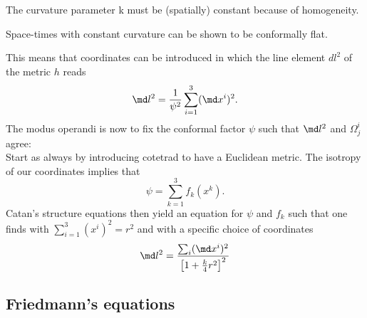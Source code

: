 	The curvature parameter k must be (spatially) constant because of homogeneity.
	\begin{statements}
		Space-times with constant curvature can be shown to be
		conformally flat.
	\end{statements}
This means that coordinates can be introduced in
	which the line element $dl^2$ of the metric $h$ reads
	\begin{equation}
		\md l^2 = \frac{1}{\psi^2} \sum_{i=1}^{3} (\md x^i)^2.
	\end{equation}
	The modus operandi is now to fix the conformal factor $\psi$ such that $\md l^2$ and $\Omega^i_j$ agree: \\
	Start as always by introducing cotetrad to have a Euclidean metric.  The isotropy of our coordinates implies that
	\begin{equation}
		\psi = \sum_{k=1}^{3} f_k(x^k).
	\end{equation}
	Catan's structure equations then yield an equation for $\psi$ and $f_k$ such that one finds with $\sum_{i=1}^{3} (x^i)^2=r^2$ and with a specific choice of coordinates
	\begin{equation}
		\md l^2 = \frac{\sum_i (\md x^i)^2}{\left[1+\frac{k}{4} r^2\right]^2}
	\end{equation}
	\subsection{Friedmann's equations}
